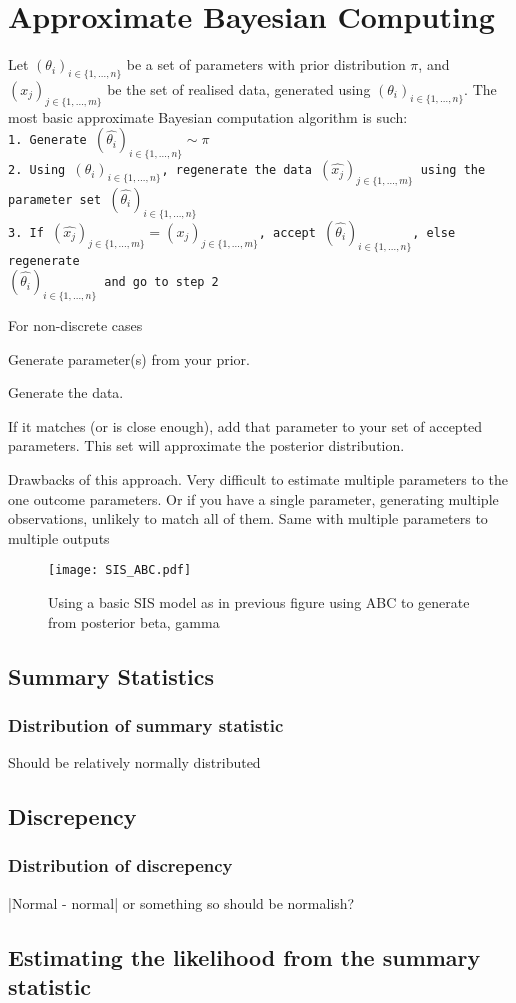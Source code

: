 \chapter{Approximate Bayesian Computing}

Let $(\theta_i)_{i\in \{1,\dots, n\}}$ be a set of parameters with prior distribution $\pi$, and $(x_j)_{j\in \{1,\dots, m\}}$ be the set of realised data, generated using $(\theta_i)_{i\in \{1,\dots, n\}}$. The most basic approximate Bayesian computation algorithm is such:
\texttt{\\
    1. Generate $(\hat{\theta_i})_{i\in \{1,\dots, n\}}\sim \pi$\\
    2. Using $(\theta_i)_{i\in \{1,\dots, n\}}$, regenerate the data $(\hat{x_j})_{j\in \{1,\dots, m\}}$ using the\\ parameter set $(\hat{\theta_i})_{i\in \{1,\dots, n\}}$\\
    3. If $(\hat{x_j})_{j\in \{1,\dots, m\}} = (x_j)_{j\in \{1,\dots, m\}}$, accept $(\hat{\theta_i})_{i\in \{1,\dots, n\}}$, else regenerate\\ $(\hat{\theta_i})_{i\in \{1,\dots, n\}}$ and go to step 2
}

For non-discrete cases

Generate parameter(s) from your prior.

Generate the data.

If it matches (or is close enough), add that parameter to your set of accepted parameters. This set will approximate the posterior distribution.

Drawbacks of this approach. Very difficult to estimate multiple parameters to the one outcome parameters. Or if you have a single parameter, generating multiple observations, unlikely to match all of them. Same with multiple parameters to multiple outputs

\begin{figure}
    \centering
    \texttt{[image: SIS\_ABC.pdf]}
    \caption{Using a basic SIS model as in previous figure using ABC to generate from posterior beta, gamma}
    \label{fig:ABC_R}
\end{figure}

\section{Summary Statistics}

\subsection*{Distribution of summary statistic}

Should be relatively normally distributed

\section{Discrepency}

\subsection*{Distribution of discrepency}

|Normal - normal| or something so should be normalish?

\section{Estimating the likelihood from the summary statistic}